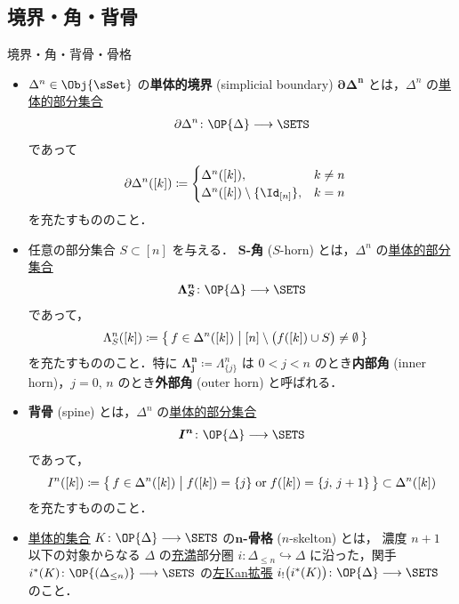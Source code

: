 \documentclass[TQFT_main]{subfiles}
\begin{document}
\subsection{境界・角・背骨}

\begin{mydef}[label=def:horn,breakable]{境界・角・背骨・骨格}
    \begin{itemize}
        \item $\Delta^n \in \Obj{\sSet}$ の\textbf{単体的境界} (simplicial boundary) $\bm{\partial \Delta^n}$ とは，$\Delta^n$ の\hyperref[def:SimpSet]{単体的部分集合}
        \begin{align}
            \partial \Delta^n \colon \OP{\Delta} \lto \SETS
        \end{align}
        であって 
        \begin{align}
            \partial \Delta^n ([k]) &\coloneqq 
            \begin{cases}
                \Delta^n ([k]), &k \neq n \\
                \Delta^n ([k]) \setminus \{\Id_{[n]}\}, &k=n
            \end{cases}
        \end{align}
        を充たすもののこと．
        
        \item 任意の部分集合 $S \subset [n]$ を与える．
        \textbf{$\bm{S}$-角} ($S$-horn) とは，$\Delta^n$ の\hyperref[def:SimpSet]{単体的部分集合}
        \begin{align}
            \bm{\Lambda^n_S} \colon \OP{\Delta} \lto \SETS
        \end{align}
        であって，
        \begin{align}
            \Lambda^n_S ([k]) &\coloneqq \bigl\{\, f \in \Delta^n([k]) \bigm| [n] \setminus \bigl(f([k]) \cup S \bigr) \neq \emptyset  \,\bigr\}
        \end{align}
        を充たすもののこと．特に $\bm{\Lambda^n_j} \coloneqq \Lambda^n_{\{j\}}$ は $0 < j < n$ のとき\textbf{内部角} (inner horn)，$j = 0,\, n$ のとき\textbf{外部角} (outer horn) と呼ばれる．

        \item \textbf{背骨} (spine) とは，$\Delta^n$ の\hyperref[def:SimpSet]{単体的部分集合}
        \begin{align}
            \bm{I^n} \colon \OP{\Delta} \lto \SETS
        \end{align}
        であって，
        \begin{align}
            I^n ([k]) \coloneqq \bigl\{\, f \in \Delta^n([k]) \bigm| f([k]) = \{j\}\; \mathrm{or}\; f([k]) = \{j,\, j+1\} \,\bigr\} \subset \Delta^n([k])
        \end{align}
        を充たすもののこと．
        \item \hyperref[def:SimpSet]{単体的集合} $K \colon \OP{\Delta} \lto \SETS$ の\textbf{$\bm{n}$-骨格} ($n$-skelton) とは，
        濃度 $n+1$ 以下の対象からなる $\Delta$ の\hyperref[def:faithful]{充満}部分圏 $i \colon \Delta_{\le n} \hookrightarrow \Delta$ に沿った，関手 $i^*(K) \colon \OP{(\Delta_{\le n})} \lto \SETS$ の\hyperref[def:Kanext]{左Kan拡張} $i_! \bigl(i^* (K)\bigr) \colon \OP{\Delta} \lto \SETS$ のこと．


\end{itemize}
\end{mydef}
\end{document}
